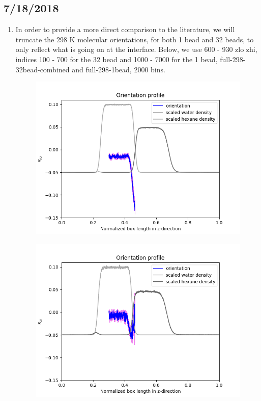 \documentclass[12pt,reqno]{amsart}
\numberwithin{equation}{section}
\begin{document}
\subsection{7/18/2018}
\begin{enumerate}
\item In order to provide a more direct comparison to the literature, we will truncate the 298 K molecular orientations, for both 1 bead and 32 beads, to only reflect what is going on at the interface.  Below, we use   600 - 930 zlo zhi, indices 100 - 700 for the 32 bead and 1000 - 7000 for the 1 bead, full-298-32bead-combined and full-298-1bead, 2000 bins.  

\begin{figure}[H]
\centering
\includegraphics[scale=0.6]{full-298-1bead-interfacial}
\end{figure}

\begin{figure}[H]
\centering
\includegraphics[scale=0.6]{full-298-32bead-interfacial}
\end{figure}

\end{enumerate}
\end{document}
